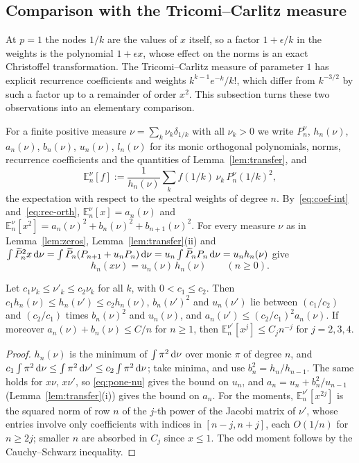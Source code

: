 \subsection{Comparison with the Tricomi--Carlitz measure}\label{sec:pone-tc}

At $p=1$ the nodes $1/k$ are the values of $x$ itself, so a factor $1+\epsilon/k$ in the weights is the polynomial
$1+\epsilon x$, whose effect on the norms is an exact Christoffel transformation. The Tricomi--Carlitz measure of
parameter $1$ has explicit recurrence coefficients and weights $k^{k-1}e^{-k}/k!$, which differ from $k^{-3/2}$ by such a
factor up to a remainder of order $x^2$. This subsection turns these two observations into an elementary comparison.

For a finite positive measure $\nu=\sum_k\nu_k\delta_{1/k}$ with all $\nu_k>0$ we write $P_n^\nu$, $h_n(\nu)$, $a_n(\nu)$,
$b_n(\nu)$, $u_n(\nu)$, $l_n(\nu)$ for its monic orthogonal polynomials, norms, recurrence coefficients and the
quantities of Lemma~\ref{lem:transfer}, and
\[
  \mathbb E_n^\nu[f]:=\frac1{h_n(\nu)}\sum_kf(1/k)\,\nu_k\,P_n^\nu(1/k)^2,
\]
the expectation with respect to the spectral weights of degree $n$. By~\eqref{eq:coef-int} and~\eqref{eq:rec-orth},
$\mathbb E_n^\nu[x]=a_n(\nu)$ and $\mathbb E_n^\nu[x^2]=a_n(\nu)^2+b_n(\nu)^2+b_{n+1}(\nu)^2$. For every measure $\nu$ as in Lemma~\ref{lem:zeros}, Lemma~\ref{lem:transfer}(ii) and
$\int\widetilde P_n^2x\,\mathrm{d}\nu=\int\widetilde P_n(P_{n+1}+u_nP_n)\,\mathrm{d}\nu=u_n\int\widetilde P_nP_n\,\mathrm{d}\nu=u_nh_n(\nu)$ give
\begin{equation}\label{eq:pone-nu}
  h_n(x\nu)=u_n(\nu)\,h_n(\nu)\qquad(n\ge0).
\end{equation}

\begin{lemma}\label{lem:pone-compare}
Let $c_1\nu_k\le\nu'_k\le c_2\nu_k$ for all $k$, with $0<c_1\le c_2$. Then $c_1h_n(\nu)\le h_n(\nu')\le c_2h_n(\nu)$,
$b_n(\nu')^2$ and $u_n(\nu')$ lie between $(c_1/c_2)$ and $(c_2/c_1)$ times $b_n(\nu)^2$ and $u_n(\nu)$, and
$a_n(\nu')\le(c_2/c_1)^2a_n(\nu)$. If moreover $a_n(\nu)+b_n(\nu)\le C/n$ for $n\ge1$, then
$\mathbb E_n^{\nu'}[x^j]\le C_jn^{-j}$ for $j=2,3,4$.
\end{lemma}

\begin{proof}
$h_n(\nu)$ is the minimum of $\int\pi^2\,\mathrm{d}\nu$ over monic $\pi$ of degree $n$, and $c_1\int\pi^2\,\mathrm{d}\nu\le\int\pi^2\,\mathrm{d}\nu'
\le c_2\int\pi^2\,\mathrm{d}\nu$; take minima, and use $b_n^2=h_n/h_{n-1}$. The same holds for $x\nu$, $x\nu'$, so
\eqref{eq:pone-nu} gives the bound on $u_n$, and $a_n=u_n+b_n^2/u_{n-1}$ (Lemma~\ref{lem:transfer}(i)) gives the bound on
$a_n$. For the moments, $\mathbb E_n^{\nu'}[x^{2j}]$ is the squared norm of row $n$ of the $j$-th power of the Jacobi matrix
of $\nu'$, whose entries involve only coefficients with indices in $[n-j,n+j]$, each $O(1/n)$ for $n\ge2j$; smaller $n$ are
absorbed in $C_j$ since $x\le1$. The odd moment follows by the Cauchy--Schwarz inequality.
\end{proof}

